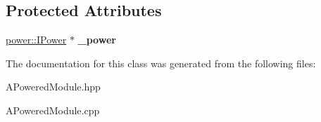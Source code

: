 \subsection*{Protected Attributes}
\begin{DoxyCompactItemize}
\item 
\mbox{\label{classwood_box_1_1module_1_1_a_powered_module_a897293dce32761f74ae234ae18634dba}} 
\mbox{\hyperlink{classwood_box_1_1power_1_1_i_power}{power\+::\+I\+Power}} $\ast$ {\bfseries \+\_\+power}
\end{DoxyCompactItemize}


The documentation for this class was generated from the following files\+:\begin{DoxyCompactItemize}
\item 
A\+Powered\+Module.\+hpp\item 
A\+Powered\+Module.\+cpp\end{DoxyCompactItemize}
